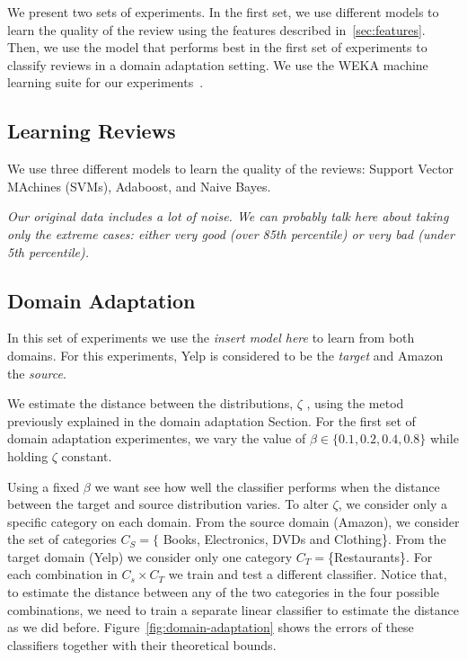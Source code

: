 \documentclass[letterpaper]{article}
\begin{document}
We present two sets of experiments. In the first set, we use different
models to learn the quality of the review using the features described
in~\ref{sec:features}. Then, we use the model that performs best in
the first set of experiments to classify reviews in a domain
adaptation setting. We use the WEKA machine learning suite for our
experiments~\cite{weka}.

\subsection{Learning Reviews}
\label{sec:learning-reviews}

We use three different models to learn the quality of the reviews:
Support Vector MAchines (SVMs), Adaboost, and Naive Bayes.

\emph{Our original data includes a lot of noise. We can probably talk
  here about taking only the extreme cases: either very good (over
  85th percentile) or very bad (under 5th percentile).}

\subsection{Domain Adaptation}
\label{sec:domain-adaptation}

In this set of experiments we use the \emph{insert model here} to
learn from both domains. For this experiments, Yelp is considered to be
the \emph{target} and Amazon the \emph{source}.

We estimate the distance between the distributions, $\zeta$ , using the metod
previously explained in the domain adaptation Section. For the first
set of domain adaptation experimentes, we vary the value of $\beta \in
\{0.1, 0.2, 0.4, 0.8\}$ while holding $\zeta$ constant.

Using a fixed $\beta$ we want see how well the classifier performs
when the distance between the target and source distribution
varies. To alter $\zeta$, we consider only a specific category on each
domain. From the source domain (Amazon), we consider the set of
categories $C_S=\{$ Books, Electronics, DVDs and Clothing\}. From the
target domain (Yelp) we consider only one category
$C_T=$\{Restaurants\}. For each combination in $C_s\times C_T$ we train
and test a different classifier. Notice that, to estimate the distance
between any of the two categories in the four possible combinations,
we need to train a separate linear classifier to estimate the distance
as we did before. Figure~\ref{fig:domain-adaptation} shows the errors
of these classifiers together with their theoretical bounds.
\end{document}
